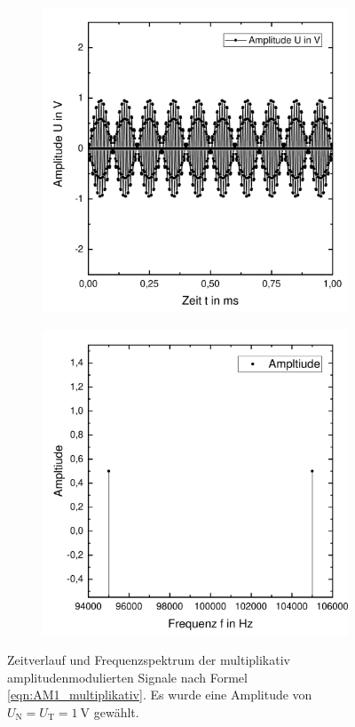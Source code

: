 \documentclass[a4paper,twoside,final]{article}
\begin{document}
\begin{figure}[htp]
    \centering
    \begin{subfigure}{0.45\textwidth}
        \includegraphics[width=\textwidth]{Bilder/AM1_mult_Zeit.pdf}
    \end{subfigure}
    \begin{subfigure}{0.45\textwidth}
        \includegraphics[width=\textwidth]{Bilder/AM1_mult_Frequenz.pdf}
    \end{subfigure}
    \caption{Zeitverlauf und Frequenzspektrum der multiplikativ amplitudenmodulierten Signale nach Formel \eqref{eqn:AM1_multiplikativ}. Es wurde eine Amplitude von $U_\text{N} = U_\text{T} = \SI{1}{\volt}$ gewählt.}
    \label{fig:AM1_multiplikativ}
\end{figure}\\
\end{document}
